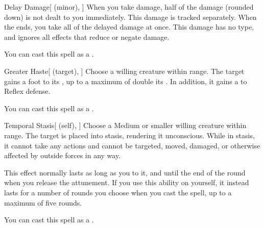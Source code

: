 \lowercase{\hypertarget{spell:Delay Damage}{}}\label{spell:Delay Damage}
\begin{apability}[\nth{3}]{\hypertarget{spell:Delay Damage}{Delay Damage}}[ (minor), ]
When you take damage, half of the damage (rounded down) is not dealt to you immediately.
This damage is tracked separately.
When the ends, you take all of the delayed damage at once.
This damage has no type, and ignores all effects that reduce or negate damage.

You can cast this spell as a .
\end{apability}
\vspace{0.25em}



\lowercase{\hypertarget{spell:Greater Haste}{}}\label{spell:Greater Haste}
\begin{attuneability}[\nth{3}]{\hypertarget{spell:Greater Haste}{Greater Haste}}[ (target), ]
Choose a willing creature within \rngmed range.
The target gains a  foot  to its , up to a maximum of double its .
In addition, it gains a   to Reflex defense.

You can cast this spell as a .
\end{attuneability}
\vspace{0.25em}



\lowercase{\hypertarget{spell:Temporal Stasis}{}}\label{spell:Temporal Stasis}
\begin{attuneability}[\nth{3}]{\hypertarget{spell:Temporal Stasis}{Temporal Stasis}}[ (self), ]
Choose a Medium or smaller willing creature within \rngmed range.
The target is placed into stasis, rendering it unconscious.
While in stasis, it cannot take any actions and cannot be targeted, moved, damaged, or otherwise affected by outside forces in any way.

This effect normally lasts as long as you  to it, and until the end of the round when you release the attunement.
If you use this ability on yourself, it instead lasts for a number of rounds you choose when you cast the spell, up to a maximum of five rounds.

You can cast this spell as a .
\end{attuneability}
\vspace{0.25em}




